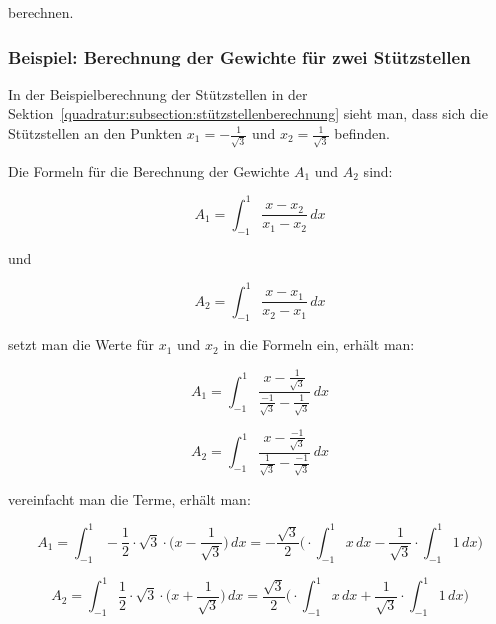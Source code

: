 \noindent
berechnen.

\newpage

\subsubsection{Beispiel: Berechnung der Gewichte für zwei Stützstellen}
In der Beispielberechnung der Stützstellen in der 
Sektion~\ref{quadratur:subsection:stützstellenberechnung} sieht man, dass sich die 
Stützstellen an den Punkten $x_{1} = -\frac{1}{\sqrt{3}} $ und $x_{2} = \frac{1}{\sqrt{3}} $ befinden.

\noindent
Die Formeln für die Berechnung der Gewichte $A_{1}$ und $A_{2}$ sind:

\begin{equation*}
    A_{1} = \int_{-1}^{1} \frac{x - x_{2}}{x_{1} - x_{2}} \, dx
\end{equation*}

\noindent
und

\begin{equation}
    A_{2} = \int_{-1}^{1} \frac{x - x_{1}}{x_{2} - x_{1}} \, dx
\end{equation}


\noindent
setzt man die Werte für $x_{1}$ und $x_{2}$ in die Formeln ein, erhält man:

\begin{equation*}
    A_{1} = \int_{-1}^{1} \frac{x - \frac{1}{\sqrt{3}}}{\frac{-1}{\sqrt{3}} - \frac{1}{\sqrt{3}}} \, dx
\end{equation*}

\begin{equation}
    A_{2} = \int_{-1}^{1} \frac{x - \frac{-1}{\sqrt{3}}}{\frac{1}{\sqrt{3}} - \frac{-1}{\sqrt{3}}} \, dx
\end{equation}

\noindent
vereinfacht man die Terme, erhält man:

\begin{equation*}
    A_{1} 
    =
    \int_{-1}^{1} -\frac{1}{2} 
    \cdot \sqrt{3} 
    \cdot \bigg(x - \frac{1}{\sqrt{3}}\bigg)
    \, dx
    =
    -\frac{\sqrt{3}}{2} 
    \bigg(
    \cdot \int_{-1}^{1}x\,dx
    -
    \frac{1}{\sqrt{3}} 
    \cdot \int_{-1}^{1}1\,dx
    \bigg)
\end{equation*}

\begin{equation}
    A_{2} 
    =
    \int_{-1}^{1} \frac{1}{2} 
    \cdot \sqrt{3}  
    \cdot \bigg(x + \frac{1}{\sqrt{3}}\bigg)
    \, dx
    =
    \frac{\sqrt{3}}{2} 
    \bigg(
    \cdot \int_{-1}^{1}x\,dx
    +
    \frac{1}{\sqrt{3}} 
    \cdot \int_{-1}^{1}1\,dx
    \bigg)
\end{equation}

